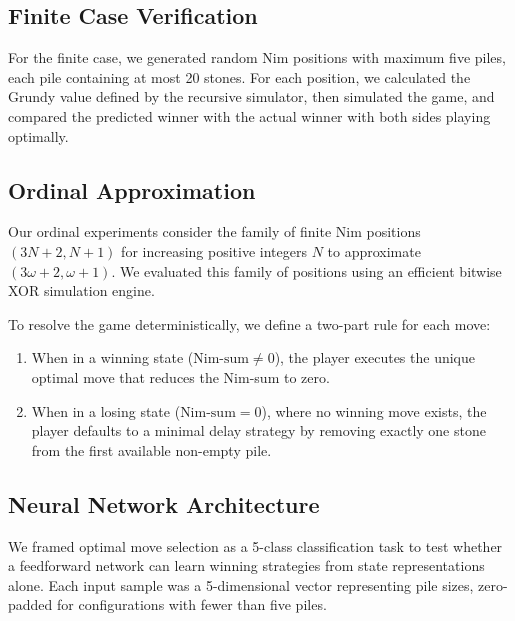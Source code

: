 \documentclass[11pt]{article}
\begin{document}
\subsection{Finite Case Verification}
For the finite case, we generated random Nim positions with maximum five piles, each pile containing at most 20 stones. For each position, we calculated the Grundy value defined by the recursive simulator, then simulated the game, and compared the predicted winner with the actual winner with both sides playing optimally. 

\subsection{Ordinal Approximation}
\label{sec: ordinal rules}

Our ordinal experiments consider the family of finite Nim positions $(3N+2, N+1)$ for increasing positive integers $N$ to approximate $(3\omega+2, \omega+1)$. We evaluated this family of positions using an efficient bitwise XOR simulation engine. 

To resolve the game deterministically, we define a two-part rule for each move:
\begin{enumerate}
    \item When in a winning state ($\text{Nim-sum} \neq 0$), the player executes the unique optimal move that reduces the Nim-sum to zero.
    \item When in a losing state ($\text{Nim-sum}=0$), where no winning move exists, the player defaults to a minimal delay strategy by removing exactly one stone from the first available non-empty pile. 
\end{enumerate}

\subsection{Neural Network Architecture}
We framed optimal move selection as a 5-class classification task to test whether a feedforward network can learn winning strategies from state representations alone. Each input sample was a 5-dimensional vector representing pile sizes, zero-padded for configurations with fewer than five piles. 
\end{document}
